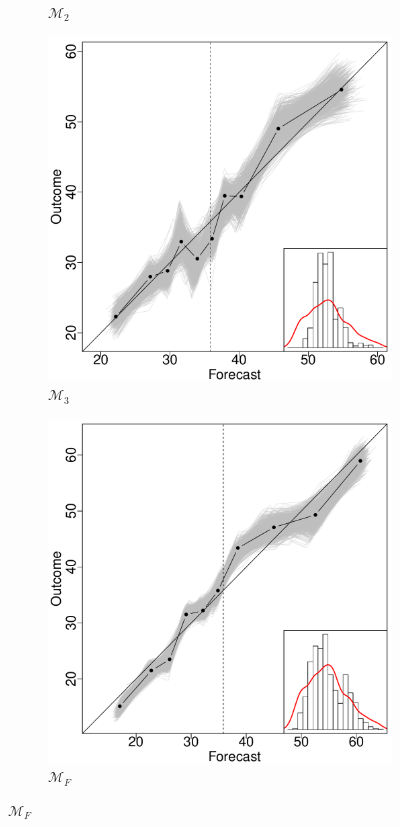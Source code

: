 \documentclass[11pt]{article}
\theoremstyle{definition}
\theoremstyle{definition}
\begin{document}
\begin{figure}
\begin{subfigure}[b]{0.24\textwidth}
                \caption{$\mathcal{M}_2$}
                \label{fig:tiger}
        \end{subfigure}
        \begin{subfigure}[b]{0.24\textwidth}
                \includegraphics[width=\textwidth]{DependentModel2}
                \caption{$\mathcal{M}_3$}
                \label{fig:tiger}
        \end{subfigure}
                \begin{subfigure}[b]{0.24\textwidth}
                \includegraphics[width=\textwidth]{IndependentModelF}
                \caption{$\mathcal{M}_F$}
                \label{RelDiagramNoF}
        \end{subfigure}   
        


\end{figure}
\end{document}
